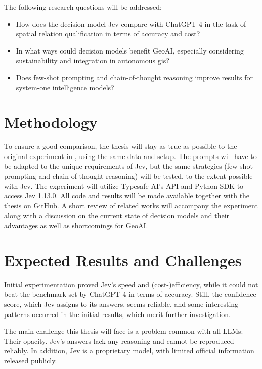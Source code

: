 The following research questions will be addressed:
\begin{itemize}
    \item How does the decision model Jev compare with ChatGPT-4 in the task of spatial relation qualification in terms of accuracy and cost?
    \item In what ways could decision models benefit GeoAI, especially considering sustainability and integration in autonomous \gls{gis}?
    \item Does few-shot prompting and chain-of-thought reasoning improve results for system-one intelligence models?
\end{itemize}

\section*{Methodology}
To ensure a good comparison, the thesis will stay as true as possible to the original experiment in \cite{jiFoundationModelsGeospatial2025}, using the same data and setup. The prompts will have to be adapted to the unique requirements of Jev, but the same strategies (few-shot prompting and chain-of-thought reasoning) will be tested, to the extent possible with Jev. The experiment will utilize Typesafe AI's API and Python SDK to access Jev 1.13.0. All code and results will be made available together with the thesis on GitHub. A short review of related works will accompany the experiment along with a discussion on the current state of decision models and their advantages as well as shortcomings for GeoAI.

\section*{Expected Results and Challenges}
Initial experimentation proved Jev's speed and (cost-)efficiency, while it could not beat the benchmark set by ChatGPT-4 in terms of accuracy. Still, the confidence score, which Jev assigns to its answers, seems reliable, and some interesting patterns occurred in the initial results, which merit further investigation.

The main challenge this thesis will face is a problem common with all LLMs: Their opacity. Jev's answers lack any reasoning and cannot be reproduced reliably. In addition, Jev is a proprietary model, with limited official information released publicly. 

\printbibliography

\newpage

